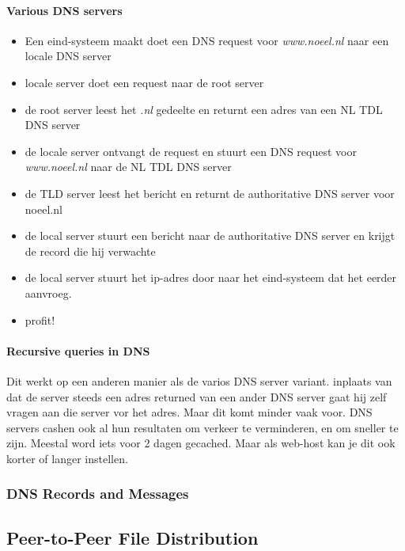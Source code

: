 \paragraph{Various DNS servers}
\begin{itemize}
	\item Een eind-systeem maakt doet een DNS request voor \textit{www.noeel.nl} naar een locale DNS server
	\item locale server doet een request naar de root server
	\item de root server leest het \textit{.nl} gedeelte en returnt een adres van een NL TDL DNS server
	\item de locale server ontvangt de request en stuurt een DNS request voor \textit{www.noeel.nl} naar de NL TDL DNS server\
	\item de TLD server leest het bericht en returnt de authoritative DNS server voor noeel.nl
	\item de local server stuurt een bericht naar de authoritative DNS server en krijgt de record die hij verwachte
	\item de local server stuurt het ip-adres door naar het eind-systeem dat het eerder aanvroeg.
	\item profit!
\end{itemize}
\paragraph{Recursive queries in DNS}
Dit werkt op een anderen manier als de varios DNS server variant. inplaats van dat de server steeds een adres returned van een ander DNS server gaat hij zelf vragen aan die server vor het adres. Maar dit komt minder vaak voor.
\newline
\newline
DNS servers cashen ook al hun resultaten om verkeer te verminderen, en om sneller te zijn. Meestal word iets voor 2 dagen gecached. Maar als web-host kan je dit ook korter of langer instellen.
\subsubsection{DNS Records and Messages}
\subsection{Peer-to-Peer File Distribution}
